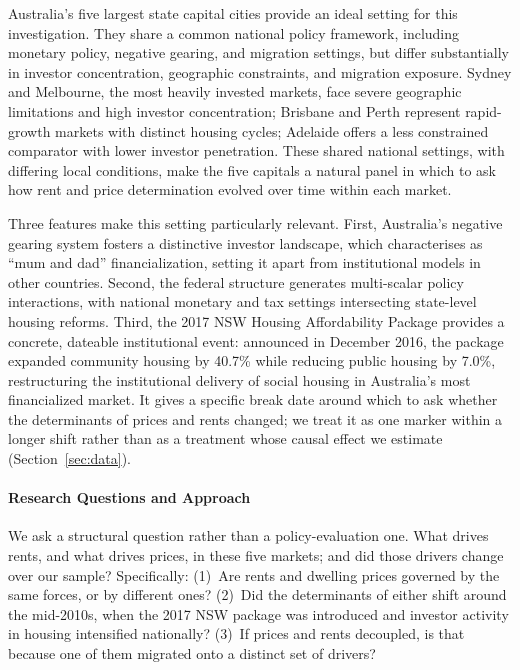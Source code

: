 \documentclass[preprint,11pt,authoryear]{elsarticle}
\begin{document}
Australia's five largest state capital cities provide an ideal setting
for this investigation. They share a common national policy framework,
including monetary policy, negative gearing, and migration settings,
but differ substantially in investor concentration, geographic
constraints, and migration exposure. Sydney and Melbourne, the most
heavily invested markets, face severe geographic limitations and high
investor concentration; Brisbane and Perth represent rapid-growth
markets with distinct housing cycles; Adelaide offers a less
constrained comparator with lower investor penetration. These shared
national settings, with differing local conditions, make the five
capitals a natural panel in which to ask how rent and price
determination evolved over time within each market.

Three features make this setting particularly relevant. First,
Australia's negative gearing system fosters a distinctive investor
landscape, which \citet{hulse2020everyman} characterises as ``mum and
dad'' financialization, setting it apart from institutional models in
other countries. Second, the federal structure generates multi-scalar policy
interactions, with national monetary and tax settings intersecting
state-level housing reforms. Third, the 2017 NSW Housing Affordability
Package provides a concrete, dateable institutional event: announced in
December 2016, the package expanded community housing by 40.7\% while
reducing public housing by 7.0\%, restructuring the institutional
delivery of social housing in Australia's most financialized market.
It gives a specific break date around which to ask whether the
determinants of prices and rents changed; we treat it as one marker
within a longer shift rather than as a treatment whose causal effect we
estimate (Section~\ref{sec:data}).

\paragraph{\bf Research Questions and Approach}
We ask a structural question rather than a policy-evaluation one. What
drives rents, and what drives prices, in these five markets; and did
those drivers change over our sample? Specifically:
(1)~Are rents and dwelling prices governed by the same forces, or by
different ones? (2)~Did the determinants of either shift around the
mid-2010s, when the 2017 NSW package was introduced and investor
activity in housing intensified nationally? (3)~If prices and rents
decoupled, is that because one of them migrated onto a distinct set of
drivers?
\end{document}
